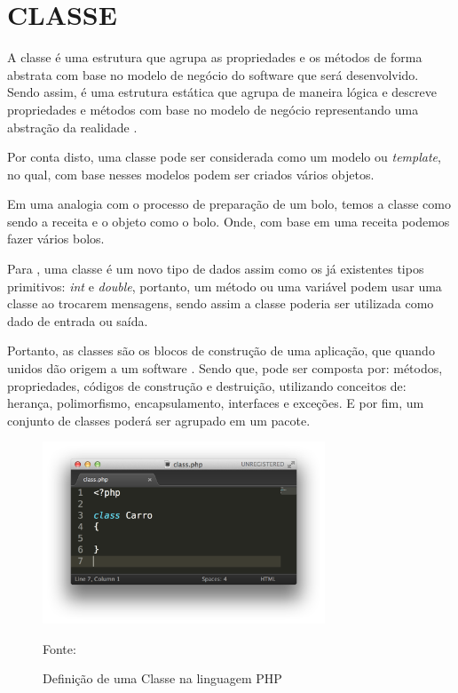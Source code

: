 \section{CLASSE}

A classe é uma estrutura que agrupa as propriedades e os métodos de forma
abstrata com base no modelo de negócio do software que será desenvolvido. 
Sendo assim, é uma estrutura estática que agrupa de maneira lógica e descreve 
propriedades e métodos com base no modelo de negócio representando uma abstração 
da realidade \cite{phpProgramandoComOrientacaoAObjetos}.

Por conta disto, uma classe pode ser considerada como um modelo ou
\textit{template}, no qual, com base nesses modelos podem ser criados vários objetos.

Em uma analogia com o processo de preparação de um bolo, temos a classe como
sendo a receita e o objeto como o bolo. Onde, com base em uma receita podemos fazer 
vários bolos.

Para , uma classe é um novo tipo de dados assim como os já
existentes tipos primitivos: \textit{int} e \textit{double}, portanto, um método
ou uma variável podem usar uma classe ao trocarem mensagens, sendo assim a classe 
poderia ser utilizada como dado de entrada ou saída.

Portanto, as classes são os blocos de construção de uma aplicação, que quando
unidos dão origem a um software \cite{learningJava}. Sendo que, pode ser 
composta por: métodos, propriedades, códigos de construção e destruição, 
utilizando conceitos de: herança, polimorfismo, encapsulamento, interfaces e 
exceções. E por fim, um conjunto de classes poderá ser agrupado em um pacote.

\begin{figure}[h!tb]
	\label{fig:classe}
	
	\centering
	\caption{Definição de uma Classe na linguagem PHP}
	
	\centering
	\includegraphics[width=0.75\textwidth]{images/class.png}
	
	\centering
	\footnotesize Fonte: \fonteOAutor
\end{figure}

